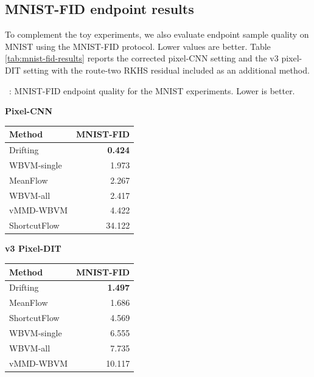 \documentclass[UTF8,11pt]{ctexart}
\begin{document}
\subsection{MNIST-FID endpoint results}

To complement the toy experiments, we also evaluate endpoint sample quality on
MNIST using the MNIST-FID protocol.  Lower values are better.  Table
\ref{tab:mnist-fid-results} reports the corrected pixel-CNN setting and the v3
pixel-DIT setting with the route-two RKHS residual included as an additional
method.

\begin{center}
\label{tab:mnist-fid-results}
{\small \tablename~\thetable: MNIST-FID endpoint quality for the MNIST experiments. Lower is better.\par}
\vspace{0.6em}
{\small
\begin{minipage}{0.47\linewidth}
\centering
\textbf{Pixel-CNN}\\[0.3em]
\begin{tabular}{lr}
\toprule
Method & MNIST-FID \\
\midrule
Drifting & \textbf{0.424} \\
WBVM-single & 1.973 \\
MeanFlow & 2.267 \\
WBVM-all & 2.417 \\
vMMD-WBVM & 4.422 \\
ShortcutFlow & 34.122 \\
\bottomrule
\end{tabular}
\end{minipage}
\hfill
\begin{minipage}{0.47\linewidth}
\centering
\textbf{v3 Pixel-DIT}\\[0.3em]
\begin{tabular}{lr}
\toprule
Method & MNIST-FID \\
\midrule
Drifting & \textbf{1.497} \\
MeanFlow & 1.686 \\
ShortcutFlow & 4.569 \\
WBVM-single & 6.555 \\
WBVM-all & 7.735 \\
vMMD-WBVM & 10.117 \\
\bottomrule
\end{tabular}
\end{minipage}
}
\end{center}

\clearpage
\end{document}
